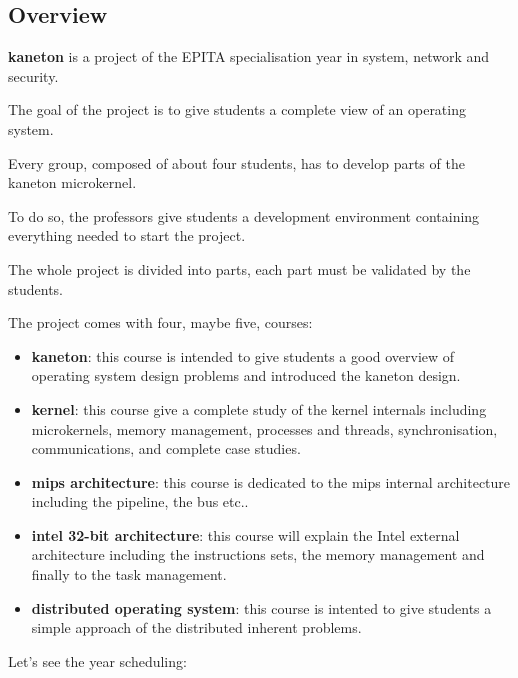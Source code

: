 \begin{multicols}{2}


%
%

\section{Overview}

\textbf{kaneton} is a project of the EPITA specialisation year in system,
network and security.

The goal of the project is to give students a complete view of an operating
system.

Every group, composed of about four students, has to develop parts
of the kaneton microkernel.

To do so, the professors give students a development environment containing
everything needed to start the project.

The whole project is divided into parts, each part must be validated by
the students.

The project comes with four, maybe five, courses:

\begin{itemize}
  \item
    \textbf{kaneton}: this course is intended to give students a good overview
    of operating system design problems and introduced the kaneton design.
  \item
    \textbf{kernel}: this course give a complete study of the kernel
    internals including microkernels, memory management, processes and threads,
    synchronisation, communications, and complete case studies.
  \item
    \textbf{mips architecture}: this course is dedicated to the mips internal
    architecture including the pipeline, the bus etc..
  \item
    \textbf{intel 32-bit architecture}: this course will explain the Intel
    external architecture including the instructions sets, the
    memory management and finally to the task management.
  \item
    \textbf{distributed operating system}: this course is intented to
    give students a simple approach of the distributed inherent problems.
\end{itemize}

Let's see the year scheduling:


\end{multicols}
